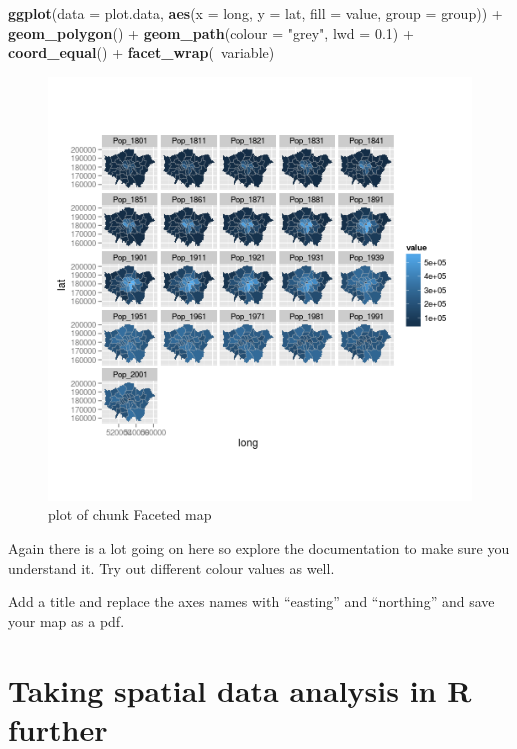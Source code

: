 \documentclass[]{article}
\makeatletter
\newenvironment{Shaded}{}{}
\newcommand{\KeywordTok}[1]{\textcolor[rgb]{0.00,0.44,0.13}{\textbf{{#1}}}}
\newcommand{\DataTypeTok}[1]{\textcolor[rgb]{0.56,0.13,0.00}{{#1}}}
\newcommand{\FloatTok}[1]{\textcolor[rgb]{0.25,0.63,0.44}{{#1}}}
\newcommand{\StringTok}[1]{\textcolor[rgb]{0.25,0.44,0.63}{{#1}}}
\newcommand{\NormalTok}[1]{{#1}}
\def\maxwidth{\ifdim\Gin@nat@width>\linewidth\linewidth
\else\Gin@nat@width\fi}
\let\Oldincludegraphics\includegraphics
\renewcommand{\includegraphics}[1]{\Oldincludegraphics[width=\maxwidth]{#1}}
\makeatother
\begin{document}
\begin{Shaded}
\begin{Highlighting}[]
\KeywordTok{ggplot}\NormalTok{(}\DataTypeTok{data =} \NormalTok{plot.data, }\KeywordTok{aes}\NormalTok{(}\DataTypeTok{x =} \NormalTok{long, }\DataTypeTok{y =} \NormalTok{lat, }\DataTypeTok{fill =} \NormalTok{value, }\DataTypeTok{group =} \NormalTok{group)) + }
    \KeywordTok{geom_polygon}\NormalTok{() + }\KeywordTok{geom_path}\NormalTok{(}\DataTypeTok{colour =} \StringTok{"grey"}\NormalTok{, }\DataTypeTok{lwd =} \FloatTok{0.1}\NormalTok{) + }\KeywordTok{coord_equal}\NormalTok{() + }
    \KeywordTok{facet_wrap}\NormalTok{(~variable)}
\end{Highlighting}
\end{Shaded}
\begin{figure}[htbp]
\centering
\includegraphics{figure/Faceted_map.png}
\caption{plot of chunk Faceted map}
\end{figure}

Again there is a lot going on here so explore the documentation to make
sure you understand it. Try out different colour values as well.

Add a title and replace the axes names with ``easting'' and ``northing''
and save your map as a pdf.

\section{Taking spatial data analysis in R further}
\end{document}
